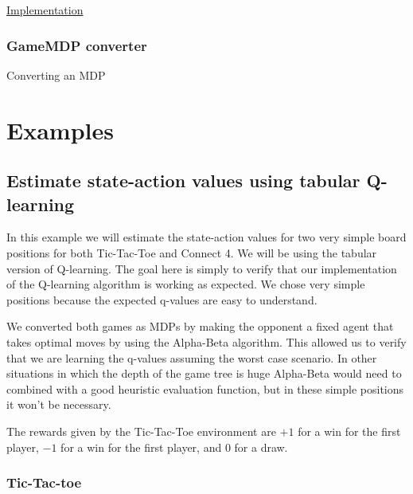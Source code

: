 \documentclass{article}
\newcommand{\GithubURL}[2]{
\noindent
\href{https://github.com/davidrobles/mlnd-capstone-code/blob/master/#1}{#2}
\break
}
\begin{document}
\GithubURL{capstone/game/tictactoe.py}{Implementation}



\subsubsection{GameMDP converter}

Converting an MDP

\section{Examples}

\subsection{Estimate state-action values using tabular Q-learning}

In this example we will estimate the state-action values for two very simple board positions for
both Tic-Tac-Toe and Connect 4. We will be using the tabular version of Q-learning. The goal here is
simply to verify that our implementation of the Q-learning algorithm is working as expected. We
chose very simple positions because the expected q-values are easy to understand.

We converted both games as MDPs by making the opponent a fixed agent that takes optimal moves by
using the Alpha-Beta algorithm. This allowed us to verify that we are learning the q-values assuming
the worst case scenario. In other situations in which the depth of the game tree is huge Alpha-Beta
would need to combined with a good heuristic evaluation function, but in these simple positions it
won't be necessary.

The rewards given by the Tic-Tac-Toe environment are $+1$ for a win for the first player, $-1$ for a
win for the first player, and $0$ for a draw.

\subsubsection{Tic-Tac-toe}

\end{document}
